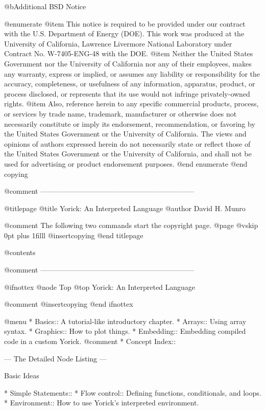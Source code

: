 @b{Additional BSD Notice}

@enumerate
@item
This notice is required to be provided under our contract with the
U.S. Department of Energy (DOE). This work was produced at the
University of California, Lawrence Livermore National Laboratory under
Contract No. W-7405-ENG-48 with the DOE.
@item
Neither the United States Government nor the University of
California nor any of their employees, makes any warranty, express or
implied, or assumes any liability or responsibility for the accuracy,
completeness, or usefulness of any information, apparatus, product, or
process disclosed, or represents that its use would not infringe
privately-owned rights.
@item
Also, reference herein to any specific commercial products,
process, or services by trade name, trademark, manufacturer or
otherwise does not necessarily constitute or imply its endorsement,
recommendation, or favoring by the United States Government or the
University of California. The views and opinions of authors expressed
herein do not necessarily state or reflect those of the United States
Government or the University of California, and shall not be used for
advertising or product endorsement purposes.
@end enumerate
@end copying

@comment -----------------------------------------------------------------

@titlepage
@title Yorick: An Interpreted Language
@author David H. Munro

@comment  The following two commands start the copyright page.
@page
@vskip 0pt plus 1filll
@insertcopying
@end titlepage

@contents

@comment -----------------------------------------------------------------

@ifnottex
@node Top
@top Yorick: An Interpreted Language

@comment @insertcopying
@end ifnottex

@menu
* Basics::                      A tutorial-like introductory chapter.
* Arrays::                      Using array syntax.
* Graphics::                    How to plot things.
* Embedding::                   Embedding compiled code in a custom Yorick.
@comment * Concept Index::               

 --- The Detailed Node Listing ---

Basic Ideas

* Simple Statements::           
* Flow control::                Defining functions, conditionals, and loops.
* Environment::                 How to use Yorick's interpreted environment.

